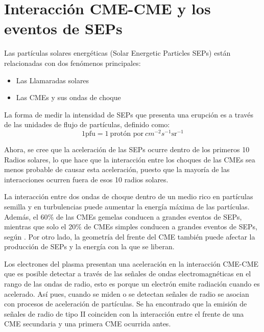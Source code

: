 \section{Interacción CME-CME y los eventos de SEPs}


Las partículas solares energéticas (Solar Energetic Particles SEPs) están relacionadas con dos fenómenos principales:
\begin{itemize}
    \item Las Llamaradas solares
\item Las \acp{CME} y sus ondas de choque
\end{itemize}

La forma de medir la intensidad de SEPs que presenta una erupción es a través de las unidades de flujo de partículas, definido como:
\begin{equation}
    1 \text{pfu}=1~\text{protón por} ~ cm^{-2}s^{-1}\text{sr}^{-1}
\end{equation}


Ahora, se cree que la aceleración de las SEPs ocurre dentro de los primeros 10 Radios solares, lo que hace que la interacción entre los choques de las \acp{CME} sea menos probable de causar esta aceleración, puesto que la mayoría de las interacciones ocurren fuera de esos 10 radios solares.

La interacción entre dos ondas de choque dentro de un medio rico en partículas semilla y en turbulencias puede aumentar la energía máxima de las partículas. Además, el 60$\%$ de las \acp{CME} gemelas conducen a grandes eventos de SEPs, mientras que solo el 20$\%$ de \acp{CME} simples conducen a grandes eventos de SEPs, según \cite{lugaz-2017}. Por otro lado, la geometría del frente del \ac{CME} también puede afectar la producción de SEPs y la energía con la que se liberan.


Los electrones del plasma presentan una aceleración en la interacción CME-CME que es posible detectar a través de las señales de ondas electromagnéticas en el rango de las ondas de radio, esto es porque un electrón emite radiación cuando es acelerado. Así pues, cuando se miden o se detectan señales de radio se asocian con procesos de aceleración de partículas. Se ha encontrado que la emisión de señales de radio de tipo II coinciden con la interacción entre el frente de una \ac{CME} secundaria y una primera \ac{CME} ocurrida antes. 

